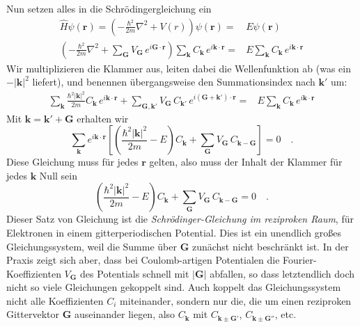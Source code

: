 Nun setzen alles in die Schrödingergleichung ein
\begin{eqnarray}
    \hat{H}  \psi(\mathbf{r}) = \left( - \frac{\hbar^2}{2m} \nabla^2 + V(r) \right) \psi(\mathbf{r}) =  & E  \psi(\mathbf{r}) \\
     \left( - \frac{\hbar^2}{2m} \nabla^2 + \sum_{\mathbf{G}} V_{\mathbf{G}} \, e^{i \mathbf{G}  \cdot \mathbf{r} } \right) \sum_{\mathbf{k}} C_{\mathbf{k}} \, e^{i \mathbf{k} \cdot \mathbf{r} } =  & E  \sum_{\mathbf{k}} C_{\mathbf{k}} \, e^{i \mathbf{k} \cdot \mathbf{r} }
\end{eqnarray}
Wir multiplizieren die Klammer aus, leiten dabei die Wellenfunktion ab (was ein $- | \mathbf{k}|^2$ liefert), und benennen übergangsweise den Summationsindex nach $\mathbf{k}'$ um:
\begin{eqnarray}
    \sum_{\mathbf{k}}  \frac{\hbar^2 | \mathbf{k}|^2}{2m} C_{\mathbf{k}} \, e^{i \mathbf{k} \cdot \mathbf{r} } 
    + \sum_{\mathbf{G}, \mathbf{k}'} V_{\mathbf{G}} \, C_{\mathbf{k}'} \, e^{i (\mathbf{G}+\mathbf{k}')  \cdot \mathbf{r} }  
    =  & E  \sum_{\mathbf{k}} C_{\mathbf{k}} \,       e^{i \mathbf{k} \cdot \mathbf{r} } 
\end{eqnarray}
Mit $\mathbf{k} = \mathbf{k}' + \mathbf{G}$ erhalten wir 
\begin{equation}
    \sum_{\mathbf{k}}   e^{i \mathbf{k} \cdot \mathbf{r} } 
    \left[
        \left( \frac{\hbar^2 | \mathbf{k}|^2}{2m} - E \right) C_{\mathbf{k}}
    + \sum_{\mathbf{G}} V_{\mathbf{G}} \, C_{\mathbf{k}- \mathbf{G}} 
    \right]
    = 0  \quad .
\end{equation}
Diese Gleichung muss für jedes $\mathbf{r}$ gelten, also muss der Inhalt der Klammer für jedes $\mathbf{k}$  Null sein
\begin{equation}
        \left( \frac{\hbar^2 | \mathbf{k}|^2}{2m} - E \right) C_{\mathbf{k}}
    + \sum_{\mathbf{G}} V_{\mathbf{G}} \, C_{\mathbf{k}- \mathbf{G}} 
    = 0  \quad . \label{eq:3_SG_rezi}
\end{equation}
Dieser Satz von Gleichung ist die \emph{Schrödinger-Gleichung im reziproken Raum}, für Elektronen in einem gitterperiodischen Potential. Dies ist ein unendlich großes Gleichungssystem, weil die Summe über $\mathbf{G}$ zunächst nicht beschränkt ist. In der Praxis zeigt sich aber, dass bei Coulomb-artigen Potentialen die Fourier-Koeffizienten  $ V_{\mathbf{G}} $ des Potentials schnell mit $|\mathbf{G}|$ abfallen, so dass letztendlich doch nicht so viele Gleichungen gekoppelt sind. 
Auch koppelt das Gleichungssystem nicht alle Koeffizienten $C_i$ miteinander, sondern nur die, die  um einen reziproken Gittervektor $\mathbf{G}$ auseinander liegen, also $C_\mathbf{k}$ mit $C_\mathbf{k \pm G'}$, $C_\mathbf{k \pm G''}$, etc. 

